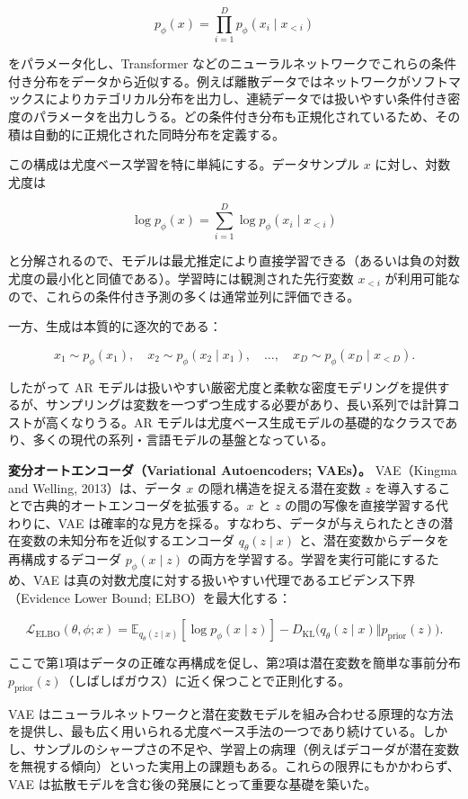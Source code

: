 \[
p_\phi(x)=\prod_{i=1}^{D} p_\phi(x_i\mid x_{<i})
\]


をパラメータ化し、Transformer などのニューラルネットワークでこれらの条件付き分布をデータから近似する。例えば離散データではネットワークがソフトマックスによりカテゴリカル分布を出力し、連続データでは扱いやすい条件付き密度のパラメータを出力しうる。どの条件付き分布も正規化されているため、その積は自動的に正規化された同時分布を定義する。

この構成は尤度ベース学習を特に単純にする。データサンプル $x$ に対し、対数尤度は

\[
\log p_\phi(x)=\sum_{i=1}^{D}\log p_\phi(x_i\mid x_{<i})
\]


と分解されるので、モデルは最尤推定により直接学習できる（あるいは負の対数尤度の最小化と同値である）。学習時には観測された先行変数 $x_{<i}$ が利用可能なので、これらの条件付き予測の多くは通常並列に評価できる。

一方、生成は本質的に逐次的である：

\[
x_1\sim p_\phi(x_1),\quad x_2\sim p_\phi(x_2\mid x_1),\quad \ldots,\quad x_D\sim p_\phi(x_D\mid x_{<D}).
\]


したがって AR モデルは扱いやすい厳密尤度と柔軟な密度モデリングを提供するが、サンプリングは変数を一つずつ生成する必要があり、長い系列では計算コストが高くなりうる。AR モデルは尤度ベース生成モデルの基礎的なクラスであり、多くの現代の系列・言語モデルの基盤となっている。

\textbf{変分オートエンコーダ（Variational Autoencoders; VAEs）。} VAE（Kingma and Welling, 2013）は、データ $x$ の隠れ構造を捉える潜在変数 $z$ を導入することで古典的オートエンコーダを拡張する。$x$ と $z$ の間の写像を直接学習する代わりに、VAE は確率的な見方を採る。すなわち、データが与えられたときの潜在変数の未知分布を近似するエンコーダ $q_\theta(z\mid x)$ と、潜在変数からデータを再構成するデコーダ $p_\phi(x\mid z)$ の両方を学習する。学習を実行可能にするため、VAE は真の対数尤度に対する扱いやすい代理であるエビデンス下界（Evidence Lower Bound; ELBO）を最大化する：

\[
\mathcal{L}_{\mathrm{ELBO}}(\theta,\phi;x)
= \mathbb{E}_{q_\theta(z\mid x)}[\log p_\phi(x\mid z)]
- D_{\mathrm{KL}}\bigl(q_\theta(z\mid x)\Vert p_{\mathrm{prior}}(z)\bigr).
\]


ここで第1項はデータの正確な再構成を促し、第2項は潜在変数を簡単な事前分布 $p_{\mathrm{prior}}(z)$（しばしばガウス）に近く保つことで正則化する。

VAE はニューラルネットワークと潜在変数モデルを組み合わせる原理的な方法を提供し、最も広く用いられる尤度ベース手法の一つであり続けている。しかし、サンプルのシャープさの不足や、学習上の病理（例えばデコーダが潜在変数を無視する傾向）といった実用上の課題もある。これらの限界にもかかわらず、VAE は拡散モデルを含む後の発展にとって重要な基礎を築いた。


